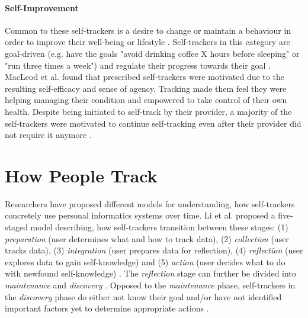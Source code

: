 \paragraph{Self-Improvement} \label{selfimprove}
Common to these self-trackers is a desire to change or maintain a behaviour in order to improve their well-being or lifestyle \citep{MacLeod2014, Ancker2015, Chung2016, Li2011, Whooley2014}. Self-trackers in this category are goal-driven (e.g. have the goals "avoid drinking coffee X hours before sleeping" or "run three times a week") and regulate their progress towards their goal \citep{Chung2016, Rooksby2014, Li2011}. MacLeod et al. found that prescribed self-trackers were motivated due to the resulting self-efficacy and sense of agency. Tracking made them feel they were helping managing their condition and empowered to take control of their own health. Despite being initiated to self-track by their provider, a majority of the self-trackers were motivated to continue self-tracking even after their provider did not require it anymore \citep{MacLeod2014}. 

\section{How People Track}
Researchers have proposed different models for understanding, how self-trackers concretely use personal informatics systems over time. Li et al. proposed a five-staged model describing, how self-trackers transition between these stages: (1) \textit{preparation} (user determines what and how to track data), (2) \textit{collection} (user tracks data), (3) \textit{integration} (user prepares data for reflection), (4) \textit{reflection} (user explores data to gain self-knowledge) and (5) \textit{action} (user decides what to do with newfound self-knowledge) \citep{Li2010}. The \textit{reflection} stage can further be divided into \textit{maintenance} and \textit{discovery} \citep{Li2011}. Opposed to the \textit{maintenance} phase, self-trackers in the \textit{discovery} phase do either not know their goal and/or have not identified important factors yet to determine appropriate actions \citep{Li2011}. 

